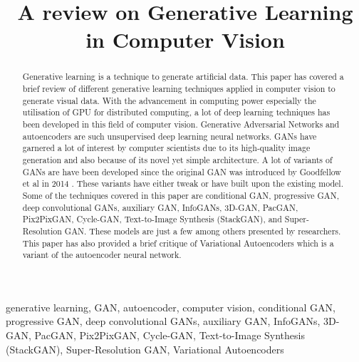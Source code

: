 \documentclass[conference]{IEEEtran}
\begin{document}
\title{A review on Generative Learning in Computer Vision}

\author{
}

\maketitle

\begin{abstract}
    Generative learning is a technique to generate artificial data. This paper has covered a brief review of different generative learning techniques applied in computer vision to generate visual data. With the advancement in computing power especially the utilisation of GPU for distributed computing, a lot of deep learning techniques has been developed in this field of computer vision. Generative Adversarial Networks and autoencoders are such unsupervised deep learning neural networks. GANs have garnered a lot of interest by computer scientists due to its high-quality image generation and also because of its novel yet simple architecture. A lot of variants of GANs are have been developed since the original GAN was introduced by Goodfellow et al in 2014 \cite{b1}. These variants have either tweak or have built upon the existing model. Some of the techniques covered in this paper are conditional GAN, progressive GAN, deep convolutional GANs, auxiliary GAN, InfoGANs, 3D-GAN, PacGAN, Pix2PixGAN, Cycle-GAN, Text-to-Image Synthesis (StackGAN), and Super-Resolution GAN. These models are just a few among others presented by researchers. This paper has also provided a brief critique of Variational Autoencoders which is a variant of the autoencoder neural network. 
\end{abstract}

\begin{IEEEkeywords}
generative learning, GAN, autoencoder, computer vision, conditional GAN, progressive GAN, deep convolutional GANs, auxiliary GAN, InfoGANs, 3D-GAN, PacGAN, Pix2PixGAN, Cycle-GAN, Text-to-Image Synthesis (StackGAN), Super-Resolution GAN, Variational Autoencoders
\end{IEEEkeywords}
\end{document}
